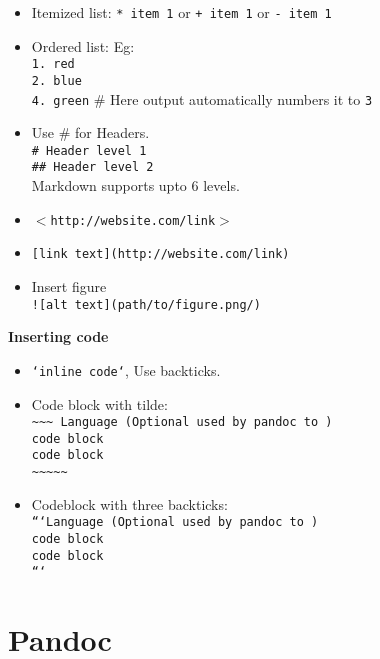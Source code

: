 \begin{itemize}

\item Itemized list: \texttt{* item 1} or \texttt{+ item 1} or \texttt{- item 1}
\item Ordered list: Eg:\\
\texttt{1. red}\\
\texttt{2. blue} \\
\texttt{4. green} \# Here output automatically numbers it to \texttt{3} \\ 
\item Use \# for Headers. \\
\texttt{\# Header level 1}\\
\texttt{\#\# Header level 2}\\
Markdown supports upto 6 levels.\\
\item \texttt{$<$http://website.com/link$>$} \\
\item \texttt{[link text](http://website.com/link)} \\
\item Insert figure\\
\texttt{![alt text](path/to/figure.png/)}\\
\end{itemize}
\textbf{Inserting code}\\
\begin{itemize}
\item \texttt{`inline code`}, Use backticks. \\
\item Code block with tilde:\\
\texttt{\~{}\~{}\~{} Language (Optional used by pandoc to )}\\
\texttt{code block}\\
\texttt{code block}\\
\texttt{\~{}\~{}\~{}\~{}\~{}} \\
\item Codeblock with three backticks:\\
\texttt{```Language (Optional used by pandoc to )}\\
\texttt{code block}\\
\texttt{code block}\\
\texttt{```}
\end{itemize}

\section{Pandoc}

